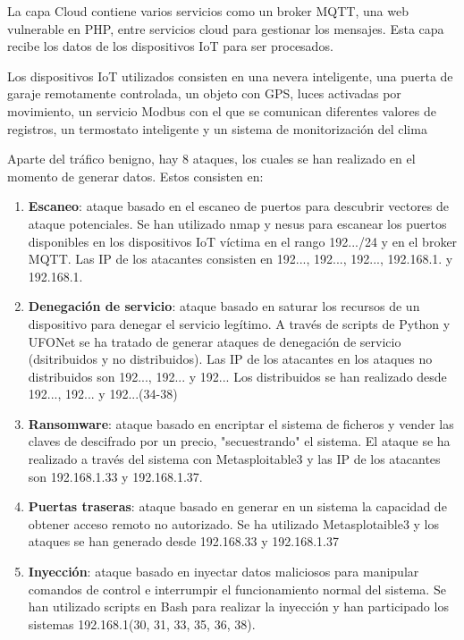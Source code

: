 La capa Cloud contiene varios servicios como un broker MQTT, una web vulnerable en PHP, entre servicios cloud para gestionar los mensajes. Esta capa recibe los datos de los dispositivos IoT para ser procesados.

Los dispositivos IoT utilizados consisten en una nevera inteligente, una puerta de garaje remotamente controlada, un objeto con GPS, luces activadas por movimiento, un servicio Modbus con el que se comunican diferentes valores de registros, un termostato inteligente y un sistema de monitorización del clima

Aparte del tráfico benigno, hay 8 ataques, los cuales se han realizado en el momento de generar datos. Estos consisten en:
\begin{enumerate}
  \item \textbf{Escaneo}: ataque basado en el escaneo de puertos para descubrir vectores de ataque potenciales. Se han utilizado nmap y nesus para escanear los puertos disponibles en los dispositivos IoT víctima en el rango 192.../24 y en el broker MQTT. Las IP de los atacantes consisten en 192..., 192..., 192..., 192.168.1. y 192.168.1.
  \item \textbf{Denegación de servicio}: ataque basado en saturar los recursos de un dispositivo para denegar el servicio legítimo. A través de scripts de Python y UFONet se ha tratado de generar ataques de denegación de servicio (dsitribuidos y no distribuidos). Las IP de los atacantes en los ataques no distribuidos son 192..., 192... y 192... Los distribuidos se han realizado desde 192..., 192... y 192...\-(34-38)
  \item \textbf{Ransomware}: ataque basado en encriptar el sistema de ficheros y vender las claves de descifrado por un precio, "secuestrando" el sistema. El ataque se ha realizado a través del sistema con Metasploitable3 y las IP de los atacantes son 192.168.1.33 y 192.168.1.37.
  \item \textbf{Puertas traseras}: ataque basado en generar en un sistema la capacidad de obtener acceso remoto no autorizado. Se ha utilizado Metasplotaible3 y los ataques se han generado desde 192.168.33 y 192.168.1.37
  \item \textbf{Inyección}: ataque basado en inyectar datos maliciosos para manipular comandos de control e interrumpir el funcionamiento normal del sistema. Se han utilizado scripts en Bash para realizar la inyección y han participado los sistemas 192.168.1(30, 31, 33, 35, 36, 38).

\end{enumerate}
